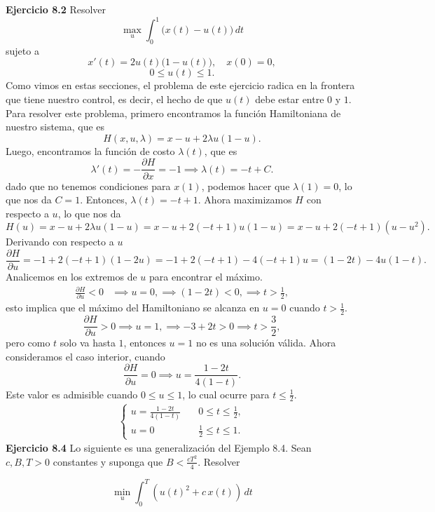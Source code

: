 \documentclass{uofa-eng-assignment}
\begin{document}
\maketitle
\textbf{Ejercicio 8.2} Resolver
\[
\max_{u} \int_{0}^{1} \bigl(x(t) - u(t)\bigr)\, dt
\]
sujeto a
\[
x'(t) = 2u(t)\bigl(1 - u(t)\bigr), \quad x(0) = 0,
\]
\[
0 \leq u(t) \leq 1.
\]
Como vimos en estas secciones, el problema de este ejercicio radica en la frontera
que tiene nuestro control, es decir, el hecho de que 
$u(t)$ debe estar entre $0$ y $1$. Para resolver este problema, primero encontramos la función Hamiltoniana de nuestro sistema, que es
\[H(x, u, \lambda) = x - u + 2\lambda u(1 - u).\]
Luego, encontramos la función de costo $\lambda(t)$, que es
\[\lambda'(t) = -\frac{\partial H}{\partial x} = -1 \implies \lambda(t) = -t + C.\]
dado que no tenemos condiciones para $x(1)$, podemos hacer que $\lambda(1) = 0$, lo que nos da $C = 1$. Entonces, $\lambda(t) = -t + 1$.
Ahora maximizamos $H$ con respecto a $u$, lo que nos da
\[ H(u) = x-u + 2\lambda u(1 - u) = x - u + 2(-t + 1)u(1 - u) = x - u + 2(-t + 1)(u - u^2).\]
Derivando con respecto a $u$
\[\frac{\partial H}{\partial u} = -1 + 2(-t + 1)(1 - 2u) = -1 + 2(-t + 1) - 4(-t + 1)u = (1-2t) -4u(1-t).\]
Analicemos en los extremos de $u$ para encontrar el máximo.
 \begin{align*}
    \frac{\partial H}{\partial u} <0 &\implies u =0, \implies  (1-2t) < 0, \implies t > \frac{1}{2},
 \end{align*}
esto implica que el máximo del Hamiltoniano se alcanza en $u=0$ cuando $t > \frac{1}{2}$.
\[
\frac{\partial H}{\partial u} >0 \implies u =1, \implies  -3+2t > 0 \implies t > \frac{3}{2},
\]
pero como $t$ solo va hasta $1$, entonces $u = 1$ no es una solución válida. Ahora consideramos el caso interior, cuando
\[
\frac{\partial H}{\partial u} = 0 \implies u = \frac{1-2t}{4(1-t)}.
\]
Este valor es admisible cuando $0 \le u \le 1$, lo cual ocurre para $t \le \frac{1}{2}$.
\begin{align*}
    \begin{cases}
        u = \frac{1-2t}{4(1-t)} \quad  &0 \leq t \leq \frac{1}{2},\\
        u = 0 \quad  &\frac{1}{2} \leq t \leq 1.
    \end{cases}
\end{align*}
\textbf{Ejercicio 8.4}  Lo siguiente es una generalización del Ejemplo 8.4.  
Sean $c, B, T > 0$ constantes y suponga que $B < \frac{cT^2}{4}$. Resolver

\[
\min_{u} \int_0^T \left( u(t)^2 + c\, x(t) \right)\, dt
\]
\end{document}
